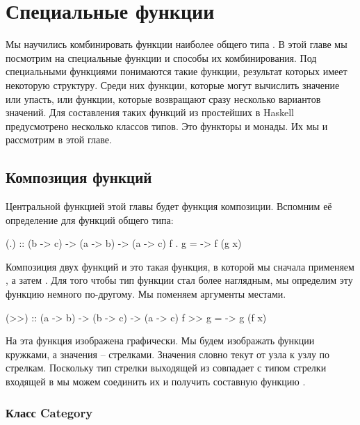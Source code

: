 \setcounter{chapter}{5}
\chapter{Специальные функции}

Мы научились комбинировать функции наиболее
общего типа . В этой главе мы посмотрим на специальные
функции и способы их комбинирования. Под специальными функциями
понимаются такие функции, результат которых имеет некоторую структуру.
Среди них функции, которые могут вычислить значение или 
упасть, или функции, которые возвращают сразу несколько вариантов значений.
Для составления таких функций из простейших в Haskell
предусмотрено несколько классов типов. Это функторы и монады. 
Их мы и рассмотрим в этой главе.

\section{Композиция функций}

Центральной функцией этой главы будет функция композиции.
Вспомним её определение для функций общего типа:

\begin{code}
(.) :: (b -> c) -> (a -> b) -> (a -> c)
f . g = \x -> f (g x)
\end{code}

Композиция двух функций  и  это такая функция,
в которой мы сначала применяем , а затем .
Для того чтобы тип функции стал более наглядным, мы
определим эту функцию немного по-другому. Мы поменяем 
аргументы местами. 

\begin{code}
(>>) :: (a -> b) -> (b -> c) -> (a -> c)
f >> g = \x -> g (f x)
\end{code}

На  эта функция изображена графически. 
Мы будем изображать функции кружками, а значения -- стрелками.
Значения словно текут от узла к узлу по стрелкам. 
Поскольку тип стрелки выходящей из  совпадает
с типом стрелки входящей в  мы можем соединить их
и получить составную функцию .



\subsection{Класс Category}


